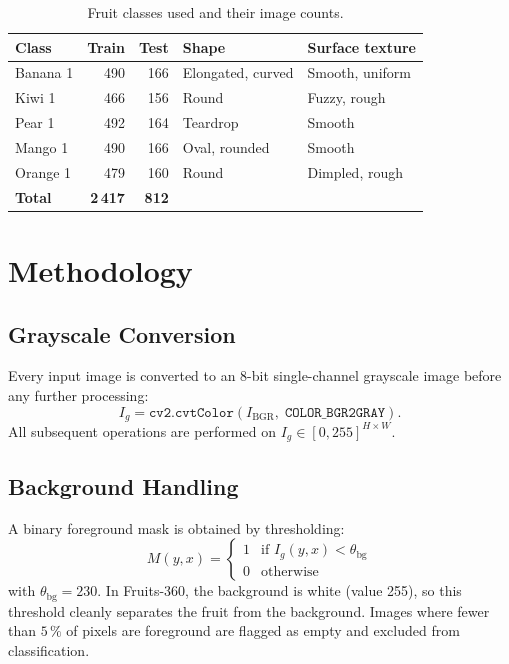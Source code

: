 \documentclass[11pt,a4paper]{article}
\begin{document}
\begin{table}[H]
  \centering
  \caption{Fruit classes used and their image counts.}
  \label{tab:classes}
  \begin{tabular}{@{}lrrll@{}}
    \toprule
    \textbf{Class} & \textbf{Train} & \textbf{Test} &
    \textbf{Shape} & \textbf{Surface texture} \\
    \midrule
    Banana 1  & 490 & 166 & Elongated, curved & Smooth, uniform \\
    Kiwi 1    & 466 & 156 & Round             & Fuzzy, rough \\
    Pear 1    & 492 & 164 & Teardrop          & Smooth \\
    Mango 1   & 490 & 166 & Oval, rounded     & Smooth \\
    Orange 1  & 479 & 160 & Round             & Dimpled, rough \\
    \midrule
    \textbf{Total} & \textbf{2\,417} & \textbf{812} & & \\
    \bottomrule
  \end{tabular}
\end{table}

\section{Methodology}

\subsection{Grayscale Conversion}

Every input image is converted to an 8-bit single-channel grayscale image
before any further processing:
\[
  I_g = \texttt{cv2.cvtColor}(I_\text{BGR},\; \texttt{COLOR\_BGR2GRAY}).
\]
All subsequent operations are performed on $I_g \in [0,255]^{H \times W}$.

\subsection{Background Handling}

A binary foreground mask is obtained by thresholding:
\[
  M(y,x) =
  \begin{cases}
    1 & \text{if } I_g(y,x) < \theta_{\text{bg}} \\
    0 & \text{otherwise}
  \end{cases}
\]
with $\theta_{\text{bg}} = 230$.  In Fruits-360, the background is white
(value 255), so this threshold cleanly separates the fruit from the
background.  Images where fewer than $5\,\%$ of pixels are foreground are
flagged as empty and excluded from classification.
\end{document}
